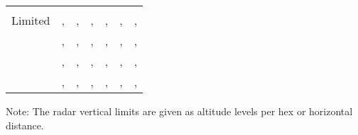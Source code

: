 \begin{twocolumntablefloat}
\begin{twocolumntable}
\begin{tabularx}{0.8\linewidth}{c*{6}{C}}
\toprule
{}&
&
&
&
&
&
\\
\\
\midrule
Limited&, &, &, &, &, &, \\
&, &, &, &, &, &, \\
&, &, &, &, &, &, \\
&, &, &, &, &, &, \\
\bottomrule
\end{tabularx}
\begin{tablenote}{0.8\linewidth}
Note: The radar vertical limits are given as altitude levels per hex or horizontal distance. 
\end{tablenote}

\end{twocolumntable}
\end{twocolumntablefloat}


